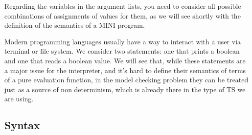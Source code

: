 \documentclass{article}
\begin{document}
Regarding the variables in the argument lists, you need to consider all possible combinations of assignments of values for them, as we will see shortly with the definition of the semantics of a MINI program.

Modern programming languages usually have a way to interact with a user via terminal or file system. We consider two statements: one that prints a boolean and one that reads a boolean value.
We will see that, while these statements are a major issue for the interpreter, and it's hard to define their semantics of terms of a pure evaluation function, in the model checking problem they can be treated just as a source of non determinism, which is already there in the type of TS we are using.

\subsection{Syntax}
\end{document}
